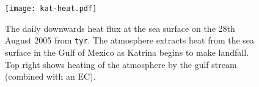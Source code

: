 
\begin{figure}
\texttt{[image: kat-heat.pdf]}
\caption{The daily downwards heat flux at the sea surface on the 28th August 2005
       from \texttt{tyr}. The atmosphere extracts heat from the sea surface
       in the Gulf of Mexico as Katrina
       begins to make landfall. Top right shows heating of the atmosphere by
       the gulf stream (combined with an EC). }
\label{fig:heat}
\end{figure}
